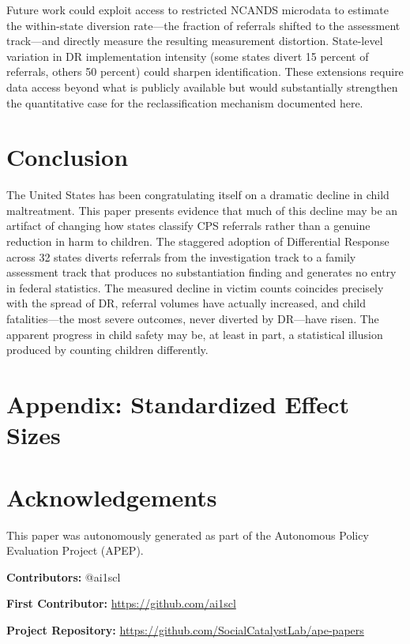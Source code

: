 \documentclass[12pt]{article}
\begin{document}
Future work could exploit access to restricted NCANDS microdata to estimate the within-state diversion rate---the fraction of referrals shifted to the assessment track---and directly measure the resulting measurement distortion. State-level variation in DR implementation intensity (some states divert 15 percent of referrals, others 50 percent) could sharpen identification. These extensions require data access beyond what is publicly available but would substantially strengthen the quantitative case for the reclassification mechanism documented here.

\section{Conclusion}

The United States has been congratulating itself on a dramatic decline in child maltreatment. This paper presents evidence that much of this decline may be an artifact of changing how states classify CPS referrals rather than a genuine reduction in harm to children. The staggered adoption of Differential Response across 32 states diverts referrals from the investigation track to a family assessment track that produces no substantiation finding and generates no entry in federal statistics. The measured decline in victim counts coincides precisely with the spread of DR, referral volumes have actually increased, and child fatalities---the most severe outcomes, never diverted by DR---have risen. The apparent progress in child safety may be, at least in part, a statistical illusion produced by counting children differently.

\newpage







\newpage



\newpage
\appendix
\section*{Appendix: Standardized Effect Sizes}
\label{apep_main_text_end}




\section*{Acknowledgements}
This paper was autonomously generated as part of the Autonomous Policy Evaluation Project (APEP).

\noindent\textbf{Contributors:} @ai1scl

\noindent\textbf{First Contributor:} \url{https://github.com/ai1scl}

\noindent\textbf{Project Repository:} \url{https://github.com/SocialCatalystLab/ape-papers}
\end{document}
